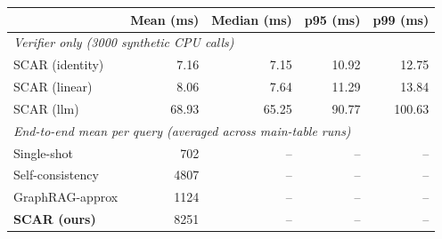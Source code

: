 \begin{tabular}{lrrrr}
\toprule
 & Mean (ms) & Median (ms) & p95 (ms) & p99 (ms) \\
\midrule
\multicolumn{5}{l}{\textit{Verifier only (3000 synthetic CPU calls)}} \\
\quad SCAR (identity) & 7.16 & 7.15 & 10.92 & 12.75 \\
\quad SCAR (linear) & 8.06 & 7.64 & 11.29 & 13.84 \\
\quad SCAR (llm) & 68.93 & 65.25 & 90.77 & 100.63 \\
\midrule
\multicolumn{5}{l}{\textit{End-to-end mean per query (averaged across main-table runs)}} \\
\quad Single-shot & 702 & -- & -- & -- \\
\quad Self-consistency & 4807 & -- & -- & -- \\
\quad GraphRAG-approx & 1124 & -- & -- & -- \\
\quad \textbf{SCAR (ours)} & 8251 & -- & -- & -- \\
\bottomrule
\end{tabular}